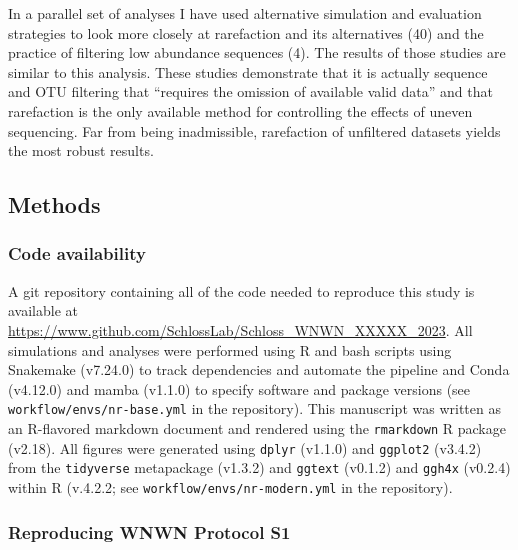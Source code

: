 \documentclass[
]{article}
\begin{document}
In a parallel set of analyses I have used alternative simulation and
evaluation strategies to look more closely at rarefaction and its
alternatives (40) and the practice of filtering low abundance sequences
(4). The results of those studies are similar to this analysis. These
studies demonstrate that it is actually sequence and OTU filtering that
``requires the omission of available valid data'' and that rarefaction
is the only available method for controlling the effects of uneven
sequencing. Far from being inadmissible, rarefaction of unfiltered
datasets yields the most robust results.

\hypertarget{methods}{%
\subsection{Methods}\label{methods}}

\hypertarget{code-availability}{%
\subsubsection{Code availability}\label{code-availability}}

A git repository containing all of the code needed to reproduce this
study is available at
\url{https://www.github.com/SchlossLab/Schloss_WNWN_XXXXX_2023}. All
simulations and analyses were performed using R and bash scripts using
Snakemake (v7.24.0) to track dependencies and automate the pipeline and
Conda (v4.12.0) and mamba (v1.1.0) to specify software and package
versions (see \texttt{workflow/envs/nr-base.yml} in the repository).
This manuscript was written as an R-flavored markdown document and
rendered using the \texttt{rmarkdown} R package (v2.18). All figures
were generated using \texttt{dplyr} (v1.1.0) and \texttt{ggplot2}
(v3.4.2) from the \texttt{tidyverse} metapackage (v1.3.2) and
\texttt{ggtext} (v0.1.2) and \texttt{ggh4x} (v0.2.4) within R (v.4.2.2;
see \texttt{workflow/envs/nr-modern.yml} in the repository).

\hypertarget{reproducing-wnwn-protocol-s1}{%
\subsubsection{Reproducing WNWN Protocol
S1}\label{reproducing-wnwn-protocol-s1}}
\end{document}
